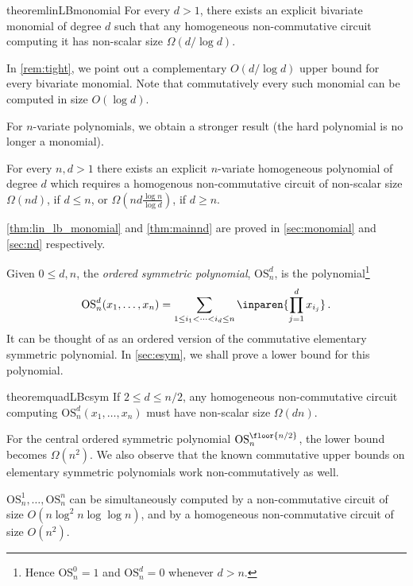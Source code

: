 \documentclass[11pt]{article}
\newcommand{\esym}[2]{\mathrm{OS}_{#1}^{#2}}
\begin{document}
\begin{restatable}{theorem}{linLBmonomial}\label{thm:lin_lb_monomial}
  For every $d>1$, there exists an explicit bivariate monomial of degree $d$ such that any homogeneous non-commutative circuit computing it has non-scalar size $\Omega(d/\log d)$.
\end{restatable}

\noindent In \autoref{rem:tight}, we point out a complementary $O(d/\log d)$ upper bound for every bivariate monomial. 
Note that commutatively every such monomial can be computed in size $O(\log d)$.

For $n$-variate polynomials, we obtain a stronger result (the hard polynomial is no longer a monomial).   

\begin{theorem}\label{thm:mainnd} For every $n,d>1$ there exists an explicit $n$-variate homogeneous polynomial of degree $d$ which requires a homogenous  non-commutative circuit of non-scalar size $\Omega(nd)$, if $d\leq n$, or $\Omega(nd \frac{\log n}{\log d})$, if $d\geq n$.  
\end{theorem}

\noindent \autoref{thm:lin_lb_monomial} and \autoref{thm:mainnd} are proved in \autoref{sec:monomial} and \autoref{sec:nd} respectively.


Given $0\leq d, n$, the \emph{ordered symmetric polynomial}, $\esym{n}{d}$, is the polynomial\footnote{Hence $\esym{n}{0}=1$ and $\esym{n}{d}=0$ whenever $d>n$.}
\[ 
 \esym{n}{d}(x_1,\dots,x_n) = \sum_{1\leq i_1 < \cdots < i_d \leq n} \inparen{\prod_{j=1}^{d} x_{i_j}}\,.
\]
It can be thought of as an ordered version of the commutative elementary symmetric polynomial. 
In \autoref{sec:esym}, we shall prove a lower bound for this polynomial.

\begin{restatable}{theorem}{quadLBcsym}\label{thm:quad_lb_csym}
  If $2\leq d\leq n/2$, any homogeneous non-commutative circuit computing $\esym{n}{d}(x_1,\dots,x_n)$ must have non-scalar size $\Omega(dn)$.
\end{restatable}

For the central ordered symmetric polynomial $\esym{n}{\floor{n/2}}$, the lower bound becomes $\Omega(n^2)$. 
We also observe that the known commutative upper bounds on elementary symmetric polynomials work non-commutatively as well.

\begin{proposition}\label{prop:ub}
  $\esym{n}{1}, \dots, \esym{n}{n}$ can be simultaneously computed by a non-commutative circuit of size $O(n\log^2n\log\log n)$, and by a homogeneous non-commutative circuit of size $O(n^2)$. 
\end{proposition}
 
\end{document}
